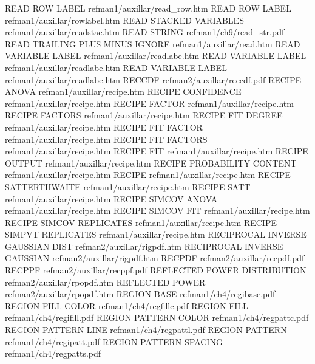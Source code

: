 READ ROW LABEL                          refman1/auxillar/read_row.htm
READ ROW LABEL                          refman1/auxillar/rowlabel.htm
READ STACKED VARIABLES                  refman1/auxillar/readstac.htm
READ STRING                             refman1/ch9/read_str.pdf
READ TRAILING PLUS MINUS IGNORE         refman1/auxillar/read.htm
READ VARIABLE LABEL                     refman1/auxillar/readlabe.htm
READ VARIABLE LABEL                     refman1/auxillar/readlabe.htm
READ VARIABLE LABEL                     refman1/auxillar/readlabe.htm
RECCDF                                  refman2/auxillar/reccdf.pdf
RECIPE ANOVA                            refman1/auxillar/recipe.htm
RECIPE CONFIDENCE                       refman1/auxillar/recipe.htm
RECIPE FACTOR                           refman1/auxillar/recipe.htm
RECIPE FACTORS                          refman1/auxillar/recipe.htm
RECIPE FIT DEGREE                       refman1/auxillar/recipe.htm
RECIPE FIT FACTOR                       refman1/auxillar/recipe.htm
RECIPE FIT FACTORS                      refman1/auxillar/recipe.htm
RECIPE FIT                              refman1/auxillar/recipe.htm
RECIPE OUTPUT                           refman1/auxillar/recipe.htm
RECIPE PROBABILITY CONTENT              refman1/auxillar/recipe.htm
RECIPE                                  refman1/auxillar/recipe.htm
RECIPE SATTERTHWAITE                    refman1/auxillar/recipe.htm
RECIPE SATT                             refman1/auxillar/recipe.htm
RECIPE SIMCOV ANOVA                     refman1/auxillar/recipe.htm
RECIPE SIMCOV FIT                       refman1/auxillar/recipe.htm
RECIPE SIMCOV REPLICATES                refman1/auxillar/recipe.htm
RECIPE SIMPVT REPLICATES                refman1/auxillar/recipe.htm
RECIPROCAL INVERSE GAUSSIAN DIST        refman2/auxillar/rigpdf.htm
RECIPROCAL INVERSE GAUSSIAN             refman2/auxillar/rigpdf.htm
RECPDF                                  refman2/auxillar/recpdf.pdf
RECPPF                                  refman2/auxillar/recppf.pdf
REFLECTED POWER DISTRIBUTION            refman2/auxillar/rpopdf.htm
REFLECTED POWER                         refman2/auxillar/rpopdf.htm
REGION BASE                             refman1/ch4/regibase.pdf
REGION FILL COLOR                       refman1/ch4/regfillc.pdf
REGION FILL                             refman1/ch4/regifill.pdf
REGION PATTERN COLOR                    refman1/ch4/regpattc.pdf
REGION PATTERN LINE                     refman1/ch4/regpattl.pdf
REGION PATTERN                          refman1/ch4/regipatt.pdf
REGION PATTERN SPACING                  refman1/ch4/regpatts.pdf
